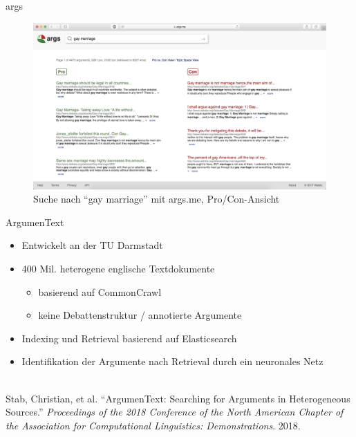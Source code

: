 \documentclass{beamer}
\begin{document}
	\begin{frame}{args}
		\begin{figure}
			\includegraphics[width=\textwidth]{img/args-screenshot-gay-marriage}
			\caption{Suche nach ``gay marriage'' mit args.me, Pro/Con-Ansicht}
		\end{figure}
	\end{frame}
	\begin{frame}{ArgumenText}
		\begin{itemize}
			\item Entwickelt an der TU Darmstadt
			\item 400 Mil. heterogene englische Textdokumente
			\begin{itemize}
				\item basierend auf CommonCrawl
				\item keine Debattenstruktur / annotierte Argumente
			\end{itemize}
			\item Indexing und Retrieval basierend auf Elasticsearch
			\item Identifikation der Argumente nach Retrieval durch ein neuronales Netz
		\end{itemize}
		~\\
		\tiny Stab, Christian, et al. ``ArgumenText: Searching for Arguments in Heterogeneous Sources.''
		\textit{Proceedings of the 2018 Conference of the North American Chapter of the Association for
		Computational Linguistics: Demonstrations}. 2018.
	\end{frame}
\end{document}
